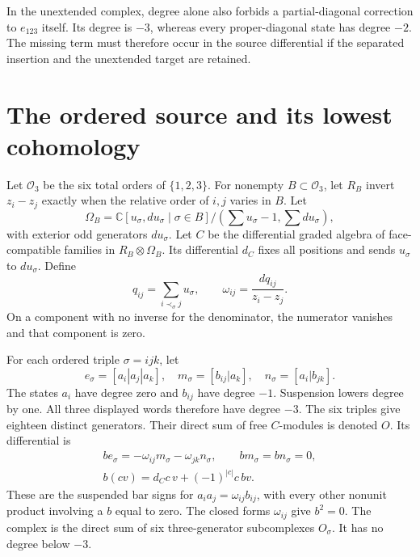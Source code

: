 In the unextended complex, degree alone also forbids a partial-diagonal correction to $e_{123}$ itself.
Its degree is $-3$, whereas every proper-diagonal state has degree $-2$.
The missing term must therefore occur in the source differential if the separated insertion and the unextended target are retained.

\section{The ordered source and its lowest cohomology}

Let $\mathcal O_3$ be the six total orders of $\{1,2,3\}$.
For nonempty $B\subset\mathcal O_3$, let $R_B$ invert $z_i-z_j$ exactly when the relative order of $i,j$ varies in $B$.
Let
\[
 \Omega_B=\mathbb C[u_\sigma,du_\sigma\mid\sigma\in B]
 /(\textstyle\sum u_\sigma-1,\sum du_\sigma),
\]
with exterior odd generators $du_\sigma$.
Let $C$ be the differential graded algebra of face-compatible families in $R_B\otimes\Omega_B$.
Its differential $d_C$ fixes all positions and sends $u_\sigma$ to $du_\sigma$.
Define
\[
 q_{ij}=\sum_{i\prec_\sigma j}u_\sigma,
 \qquad \omega_{ij}=\frac{dq_{ij}}{z_i-z_j}.
\]
On a component with no inverse for the denominator, the numerator vanishes and that component is zero.

For each ordered triple $\sigma=ijk$, let
\[
 e_\sigma=[a_i|a_j|a_k],\quad
 m_\sigma=[b_{ij}|a_k],\quad
 n_\sigma=[a_i|b_{jk}].
\]
The states $a_i$ have degree zero and $b_{ij}$ have degree $-1$.
Suspension lowers degree by one.
All three displayed words therefore have degree $-3$.
The six triples give eighteen distinct generators.
Their direct sum of free $C$-modules is denoted $O$.
Its differential is
\begin{equation}\label{eq:bdnz-ordered}
 \begin{gathered}
 be_\sigma=-\omega_{ij}m_\sigma-\omega_{jk}n_\sigma,
 \qquad bm_\sigma=bn_\sigma=0,\\
 b(cv)=d_Cc\,v+(-1)^{|c|}c\,bv.
 \end{gathered}
\end{equation}
These are the suspended bar signs for
$a_i a_j=\omega_{ij}b_{ij}$, with every other nonunit product involving a $b$ equal to zero.
The closed forms $\omega_{ij}$ give $b^2=0$.
The complex is the direct sum of six three-generator subcomplexes $O_\sigma$.
It has no degree below $-3$.

